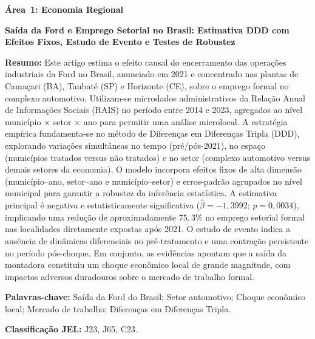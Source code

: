 \documentclass[12pt,a4paper]{article}
\begin{document}
\begin{center}
{\large\textbf{\'Area~1: Economia Regional}}

\bigskip

{\large\textbf{Sa\'ida da Ford e Emprego Setorial no Brasil: Estimativa DDD com
Efeitos Fixos, Estudo de Evento e Testes de Robustez}}
\end{center}

\bigskip

\noindent\textbf{Resumo:} Este artigo estima o efeito causal do encerramento das opera\c{c}\~oes industriais da Ford no Brasil, anunciado em 2021 e concentrado nas plantas de Cama\c{c}ari (BA), Taubat\'e (SP) e Horizonte (CE), sobre o emprego formal no complexo automotivo. Utilizam-se microdados administrativos da Rela\c{c}\~ao Anual de Informa\c{c}\~oes Sociais (RAIS) no per\'iodo entre 2014 e 2023, agregados ao n\'ivel munic\'ipio $\times$ setor $\times$ ano para permitir uma an\'alise microlocal. A estrat\'egia emp\'irica fundamenta-se no m\'etodo de Diferen\c{c}as em Diferen\c{c}as Tripla (DDD), explorando varia\c{c}\~oes simult\^aneas no tempo (pr\'e/p\'os-2021), no espa\c{c}o (munic\'ipios tratados versus n\~ao tratados) e no setor (complexo automotivo versus demais setores da economia). O modelo incorpora efeitos fixos de alta dimens\~ao (munic\'ipio--ano, setor--ano e munic\'ipio--setor) e erros-padr\~ao agrupados no n\'ivel municipal para garantir a robustez da infer\^encia estat\'istica. A estimativa principal \'e negativa e estatisticamente significativa ($\hat{\beta} = -1{,}3992$; $p = 0{,}0034$), implicando uma redu\c{c}\~ao de aproximadamente $75{,}3\%$ no emprego setorial formal nas localidades diretamente expostas ap\'os 2021. O estudo de evento indica a aus\^encia de din\^amicas diferenciais no pr\'e-tratamento e uma contra\c{c}\~ao persistente no per\'iodo p\'os-choque. Em conjunto, as evid\^encias apontam que a sa\'ida da montadora constituiu um choque econ\^omico local de grande magnitude, com impactos adversos duradouros sobre o mercado de trabalho formal.

\medskip
\noindent\textbf{Palavras-chave:} Sa\'ida da Ford do Brasil; Setor automotivo; Choque econ\^omico local; Mercado de trabalho; Diferen\c{c}as em Diferen\c{c}as Tripla.

\medskip
\noindent\textbf{Classifica\c{c}\~ao JEL:} J23, J65, C23.
\end{document}
